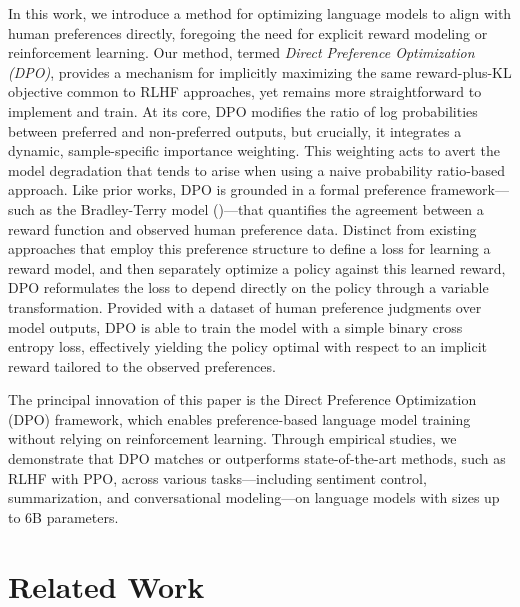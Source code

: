 In this work, we introduce a method for optimizing language models to align with human preferences directly, foregoing the need for explicit reward modeling or reinforcement learning. Our method, termed \textit{{Direct Preference Optimization} (DPO)}, provides a mechanism for implicitly maximizing the same reward-plus-KL objective common to RLHF approaches, yet remains more straightforward to implement and train. At its core, DPO modifies the ratio of log probabilities between preferred and non-preferred outputs, but crucially, it integrates a dynamic, sample-specific importance weighting. This weighting acts to avert the model degradation that tends to arise when using a naive probability ratio-based approach. Like prior works, DPO is grounded in a formal preference framework—such as the Bradley-Terry model (\cite{bradley1952rankanalysis})—that quantifies the agreement between a reward function and observed human preference data. Distinct from existing approaches that employ this preference structure to define a loss for learning a reward model, and then separately optimize a policy against this learned reward, DPO reformulates the loss to depend directly on the policy through a variable transformation. Provided with a dataset of human preference judgments over model outputs, DPO is able to train the model with a simple binary cross entropy loss, effectively yielding the policy optimal with respect to an implicit reward tailored to the observed preferences.

The principal innovation of this paper is the Direct Preference Optimization (DPO) framework, which enables preference-based language model training without relying on reinforcement learning. Through empirical studies, we demonstrate that DPO matches or outperforms state-of-the-art methods, such as RLHF with PPO, across various tasks—including sentiment control, summarization, and conversational modeling—on language models with sizes up to 6B parameters.

\section{Related Work}

